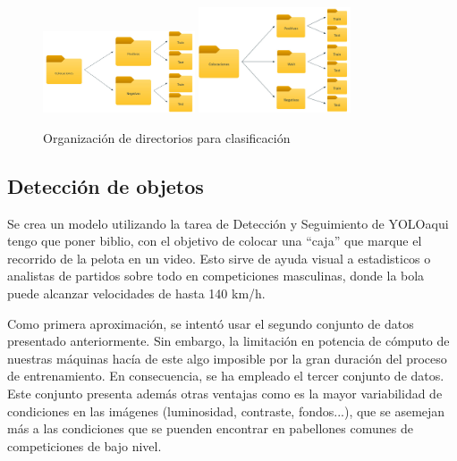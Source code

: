 \documentclass[12pt]{report} %
\begin{document}
    \begin{figure}[H]
        \includegraphics[width=0.4\textwidth]{folders_binario.jpeg}
        \hspace{0.3cm}
        \includegraphics[width=0.4\textwidth]{folders_ternario.jpg}
        \caption {Organización de directorios para clasificación}
    \end{figure}

    
    \subsection{Detección de objetos}
    Se crea un modelo utilizando la tarea de Detección y Seguimiento de YOLO{aqui tengo que poner biblio}, con el objetivo de colocar una ``caja'' que marque el recorrido de la pelota en un video. Esto sirve de ayuda visual a estadisticos o analistas de partidos sobre todo en competiciones masculinas, donde la bola puede alcanzar velocidades de hasta 140 km/h. 

    Como primera aproximación, se intentó usar el segundo conjunto de datos presentado anteriormente. Sin embargo, la limitación en potencia de cómputo de nuestras máquinas hacía de este algo imposible por la gran duración del proceso de entrenamiento. En consecuencia, se ha empleado el tercer conjunto de datos. Este conjunto presenta además otras ventajas como es la mayor variabilidad de condiciones en las imágenes (luminosidad, contraste, fondos...), que se asemejan más a las condiciones que se puenden encontrar en pabellones comunes de competiciones de bajo nivel.
\end{document}
